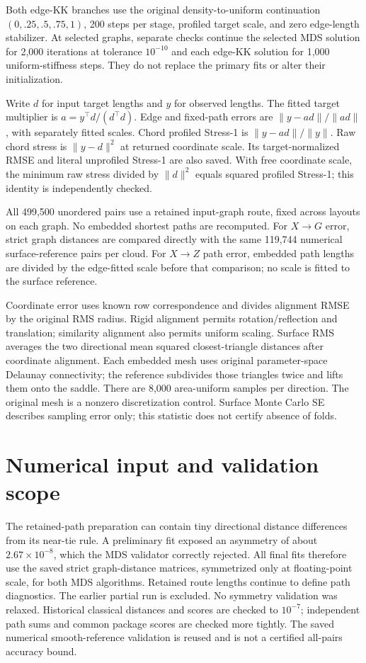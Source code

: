 \documentclass[11pt,letterpaper,landscape]{article}
\begin{document}
Both edge-KK branches use the original density-to-uniform continuation
$(0,.25,.5,.75,1)$, 200 steps per stage, profiled target scale, and zero
edge-length stabilizer. At selected graphs, separate checks continue the
selected MDS solution for 2,000 iterations at tolerance $10^{-10}$ and each
edge-KK solution for 1,000 uniform-stiffness steps. They do not replace the
primary fits or alter their initialization.

Write $d$ for input target lengths and $y$ for observed lengths. The fitted target
multiplier is $a=y^\top d/(d^\top d)$. Edge and fixed-path errors are
$\|y-ad\|/\|ad\|$, with separately fitted scales. Chord profiled Stress-1 is
$\|y-ad\|/\|y\|$. Raw chord stress is $\|y-d\|^2$ at returned coordinate scale.
Its target-normalized RMSE and literal unprofiled Stress-1 are also saved.
With free coordinate scale, the minimum raw stress divided by $\|d\|^2$ equals
squared profiled Stress-1; this identity is independently checked.

All 499,500 unordered pairs use a retained input-graph route, fixed across
layouts on each graph. No embedded shortest paths are recomputed. For $X\to G$
error, strict graph distances are compared directly with the same 119,744
numerical surface-reference pairs per cloud. For $X\to Z$ path error, embedded
path lengths are divided by the edge-fitted scale before that comparison;
no scale is fitted to the surface reference.

Coordinate error uses known row correspondence and divides alignment RMSE by
the original RMS radius. Rigid alignment permits rotation/reflection and
translation; similarity alignment also permits uniform scaling. Surface RMS
averages the two directional mean squared closest-triangle distances after
coordinate alignment. Each embedded mesh uses original parameter-space Delaunay
connectivity; the reference subdivides those triangles twice and lifts them
onto the saddle. There are 8,000 area-uniform samples per direction. The original
mesh is a nonzero discretization control. Surface Monte Carlo SE describes
sampling error only; this statistic does not certify absence of folds.

\section*{Numerical input and validation scope}
The retained-path preparation can contain tiny directional distance differences
from its near-tie rule. A preliminary fit exposed an asymmetry of about
$2.67\times10^{-8}$, which the MDS validator correctly rejected. All final fits
therefore use the saved strict graph-distance matrices, symmetrized only at
floating-point scale, for both MDS algorithms. Retained route lengths continue
to define path diagnostics. The earlier partial run is excluded. No symmetry
validation was relaxed. Historical classical distances and scores are checked
to $10^{-7}$; independent path sums and common package scores are checked more
tightly. The saved numerical smooth-reference validation is reused and is not
a certified all-pairs accuracy bound.
\end{document}
